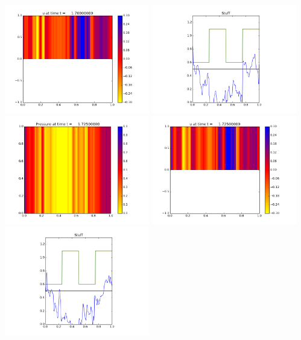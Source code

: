 \documentclass[11pt]{article}
\begin{document}
\includegraphics[width=0.475\textwidth]{frame0068fig1.png}
\vskip 10pt 
\includegraphics[width=0.475\textwidth]{frame0068fig3.png}
\vskip 10pt 
\includegraphics[width=0.475\textwidth]{frame0069fig0.png}
\includegraphics[width=0.475\textwidth]{frame0069fig1.png}
\vskip 10pt 
\includegraphics[width=0.475\textwidth]{frame0069fig3.png}
\end{document}
